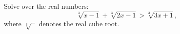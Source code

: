 Solve over the real numbers:
\[
\sqrt[3]{x-1}+\sqrt[3]{2x-1}>\sqrt[3]{3x+1},
\]
where $\sqrt[3]{\phantom{x}}$ denotes the real cube root.
